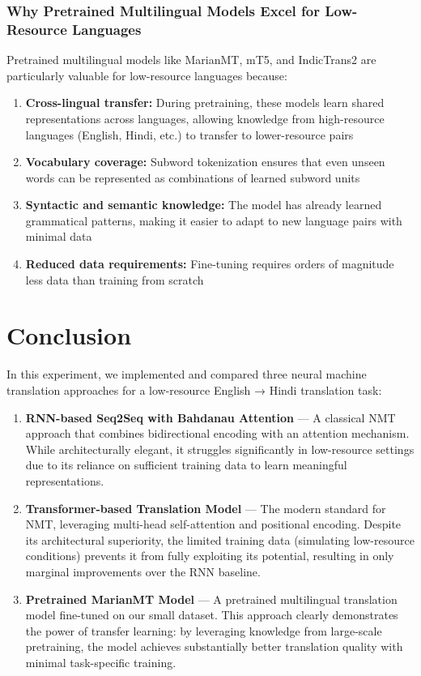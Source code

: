 \documentclass[12pt,a4paper,oneside]{report}
\providecommand{\tightlist}{\setlength{\itemsep}{0pt}\setlength{\parskip}{0pt}}
\begin{document}
\hypertarget{why-pretrained-multilingual-models-excel-for-low-resource-languages}{%
\subsubsection{Why Pretrained Multilingual Models Excel for Low-Resource Languages}\label{why-pretrained-multilingual-models-excel-for-low-resource-languages}}

Pretrained multilingual models like MarianMT, mT5, and IndicTrans2 are particularly valuable for low-resource languages because:

\begin{enumerate}
\def\labelenumi{\arabic{enumi}.}
\tightlist
\item
  \textbf{Cross-lingual transfer:} During pretraining, these models learn shared representations across languages, allowing knowledge from high-resource languages (English, Hindi, etc.) to transfer to lower-resource pairs
\item
  \textbf{Vocabulary coverage:} Subword tokenization ensures that even unseen words can be represented as combinations of learned subword units
\item
  \textbf{Syntactic and semantic knowledge:} The model has already learned grammatical patterns, making it easier to adapt to new language pairs with minimal data
\item
  \textbf{Reduced data requirements:} Fine-tuning requires orders of magnitude less data than training from scratch
\end{enumerate}

\section{Conclusion}
In this experiment, we implemented and compared three neural machine translation approaches for a low-resource English → Hindi translation task:

\begin{enumerate}
\def\labelenumi{\arabic{enumi}.}
\item
  \textbf{RNN-based Seq2Seq with Bahdanau Attention} --- A classical NMT approach that combines bidirectional encoding with an attention mechanism. While architecturally elegant, it struggles significantly in low-resource settings due to its reliance on sufficient training data to learn meaningful representations.
\item
  \textbf{Transformer-based Translation Model} --- The modern standard for NMT, leveraging multi-head self-attention and positional encoding. Despite its architectural superiority, the limited training data (simulating low-resource conditions) prevents it from fully exploiting its potential, resulting in only marginal improvements over the RNN baseline.
\item
  \textbf{Pretrained MarianMT Model} --- A pretrained multilingual translation model fine-tuned on our small dataset. This approach clearly demonstrates the power of transfer learning: by leveraging knowledge from large-scale pretraining, the model achieves substantially better translation quality with minimal task-specific training.
\end{enumerate}
\end{document}
